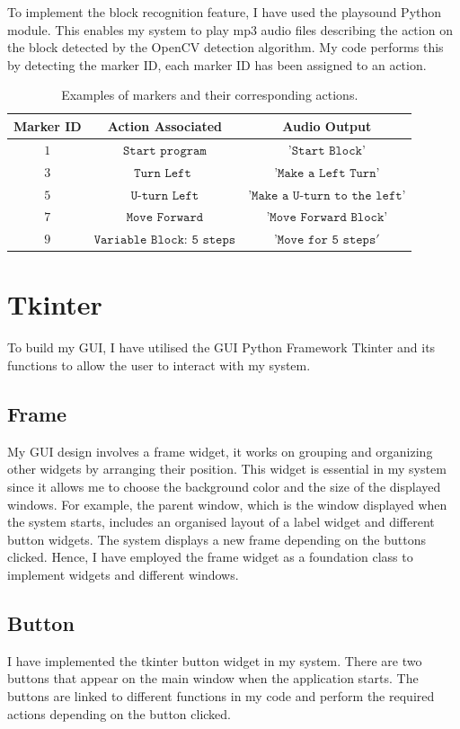 \documentclass[oneside,%
                    author={Malak Hajji},
                    degree={BSc},
                    title={Designing An Accessible Computational Toolkit For Students},
                  subtitle={With Mixed Visual Abilities}]{dissertation}
\begin{document}
To implement the block recognition feature, I have used the playsound Python module. This enables my system to play mp3 audio files describing the action on the block detected by the OpenCV detection algorithm. My code performs this by detecting the marker ID, each marker ID has been assigned to an action. 
\begin{table}[t]
\centering
\begin{tabular}{|cc|c|}
\hline
Marker ID      & Action Associated      & Audio Output      \\
\hline
$1     $ & $\texttt{Start program} $ & $\texttt{'Start Block'}    $ \\
$3     $ & $\texttt{Turn Left     }$ & $\texttt{'Make a Left Turn'}   $ \\
$5     $ & $\texttt{U-turn Left}   $ & $ \texttt{'Make a U-turn to the left'} $\\
$7     $ & $\texttt{Move Forward}  $ & $\texttt{'Move Forward Block'}   $ \\
$9     $ & $\texttt{Variable Block: 5 steps}  $ & $\texttt{'Move for 5 steps}'  $ \\
\hline
\end{tabular}
\caption{Examples of markers and their corresponding actions.}
\label{tab}
\end{table}

\section{Tkinter}

To build my GUI, I have utilised the GUI Python Framework Tkinter and its functions to allow the user to interact with my system.

\subsection{Frame}
My GUI design involves a frame widget, it works on grouping and organizing other widgets by arranging their position. This widget is essential in my system since it allows me to choose the background color and the size of the displayed windows. For example, the parent window, which is the window displayed when the system starts, includes an organised layout of a label widget and different button widgets. The system displays a new frame depending on the buttons clicked. Hence, I have employed the frame widget as a foundation class to implement widgets and different windows.

\subsection{Button}
I have implemented the tkinter button widget in my system. There are two buttons that appear on the main window when the application starts. The buttons are linked to different functions in my code and perform the required actions depending on the button clicked.
\end{document}
